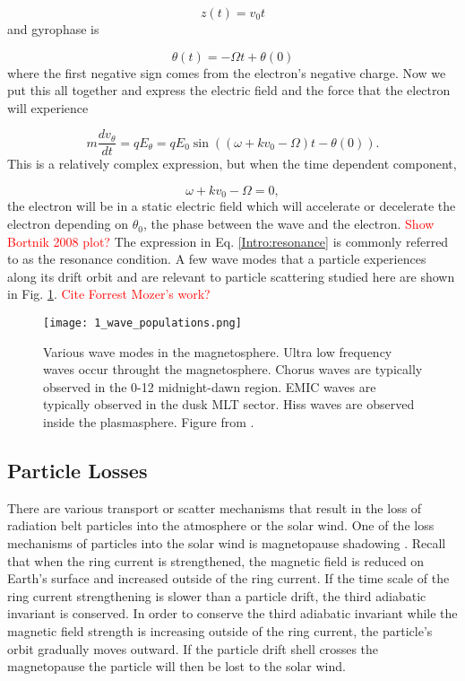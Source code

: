 \begin{equation}
z(t) = v_0 t
\end{equation} and gyrophase is

\begin{equation}
\theta(t) = -\Omega t + \theta(0)
\end{equation} where the first negative sign comes from the electron's negative charge. Now we put this all together and express the electric field and the force that the electron will experience

\begin{equation}
m \frac{dv_\theta}{dt} = qE_\theta = qE_0 \sin{((\omega + kv_0 - \Omega)t - \theta(0))}.
\end{equation} This is a relatively complex expression, but when the time dependent component, 

\begin{equation} \label{Intro:resonance}
\omega + kv_0 - \Omega = 0,
\end{equation} the electron will be in a static electric field which will accelerate or decelerate the electron depending on $\theta_0$, the phase between the wave and the electron. \textcolor{red}{Show Bortnik 2008 plot?} The expression in Eq. \ref{Intro:resonance} is commonly referred to as the resonance condition. A few wave modes that a particle experiences along its drift orbit and are relevant to particle scattering studied here are shown in Fig. \ref{Intro:waves}. \textcolor{red}{Cite Forrest Mozer's work?}

\begin{figure}
\texttt{[image: 1\_wave\_populations.png]}
\caption{Various wave modes in the magnetosphere. Ultra low frequency waves occur throught the magnetosphere. Chorus waves are typically observed in the 0-12 midnight-dawn region. EMIC waves are typically observed in the dusk MLT sector. Hiss waves are observed inside the plasmasphere. Figure from \citet{Millan2007}.}
\label{Intro:waves}
\end{figure}

\subsection{Particle Losses}\label{Intro:losses}
There are various transport or scatter mechanisms that result in the loss of radiation belt particles into the atmosphere or the solar wind. One of the loss mechanisms of particles into the solar wind is magnetopause shadowing \citep{Ukhorskiy2006}. Recall that when the ring current is strengthened, the magnetic field is reduced on Earth's surface and increased outside of the ring current. If the time scale of the ring current strengthening is slower than a particle drift, the third adiabatic invariant is conserved. In order to conserve the third adiabatic invariant while the magnetic field strength is increasing outside of the ring current, the particle's orbit gradually moves outward. If the particle drift shell crosses the magnetopause the particle will then be lost to the solar wind.

